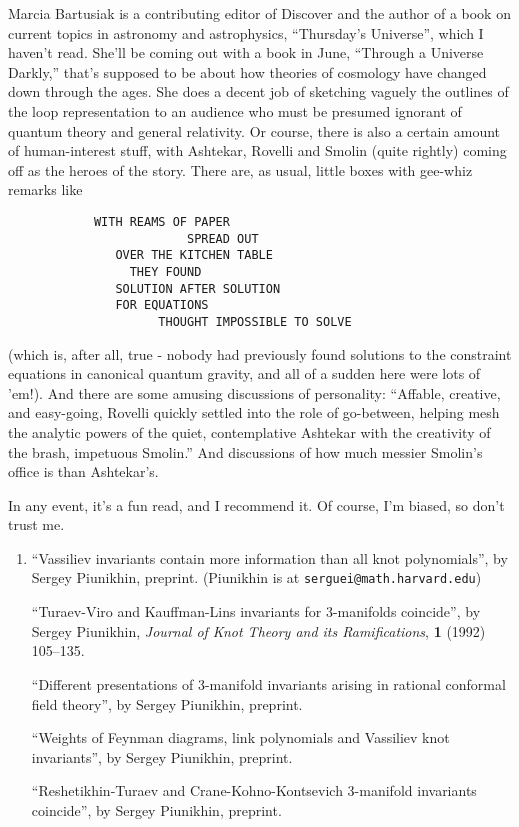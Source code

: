 \documentclass{article}
\begin{document}
Marcia Bartusiak is a contributing editor of Discover and the author of
a book on current topics in astronomy and astrophysics, ``Thursday's
Universe'', which I haven't read. She'll be coming out with a book in
June, ``Through a Universe Darkly,'' that's supposed to be about how
theories of cosmology have changed down through the ages. She does a
decent job of sketching vaguely the outlines of the loop representation
to an audience who must be presumed ignorant of quantum theory and
general relativity. Or course, there is also a certain amount of
human-interest stuff, with Ashtekar, Rovelli and Smolin (quite rightly)
coming off as the heroes of the story. There are, as usual, little boxes
with gee-whiz remarks like

\begin{verbatim}
            WITH REAMS OF PAPER
                         SPREAD OUT
               OVER THE KITCHEN TABLE
                 THEY FOUND
               SOLUTION AFTER SOLUTION
               FOR EQUATIONS
                     THOUGHT IMPOSSIBLE TO SOLVE
\end{verbatim}

(which is, after all, true - nobody had previously found solutions to
the constraint equations in canonical quantum gravity, and all of a
sudden here were lots of 'em!). And there are some amusing discussions
of personality: ``Affable, creative, and easy-going, Rovelli quickly
settled into the role of go-between, helping mesh the analytic powers of
the quiet, contemplative Ashtekar with the creativity of the brash,
impetuous Smolin.'' And discussions of how much messier Smolin's office
is than Ashtekar's.

In any event, it's a fun read, and I recommend it. Of course, I'm
biased, so don't trust me.

\begin{enumerate}
\def\labelenumi{\arabic{enumi})}
\setcounter{enumi}{1}
\item
  ``Vassiliev invariants contain more information than all knot
  polynomials'', by Sergey Piunikhin, preprint. (Piunikhin is at
  \texttt{serguei@math.harvard.edu})

  ``Turaev-Viro and Kauffman-Lins invariants for 3-manifolds coincide'',
  by Sergey Piunikhin, \emph{Journal of Knot Theory and its
  Ramifications}, \textbf{1} (1992) 105--135.

  ``Different presentations of 3-manifold invariants arising in rational
  conformal field theory'', by Sergey Piunikhin, preprint.

  ``Weights of Feynman diagrams, link polynomials and Vassiliev knot
  invariants'', by Sergey Piunikhin, preprint.

  ``Reshetikhin-Turaev and Crane-Kohno-Kontsevich 3-manifold invariants
  coincide'', by Sergey Piunikhin, preprint.
\end{enumerate}
\end{document}
